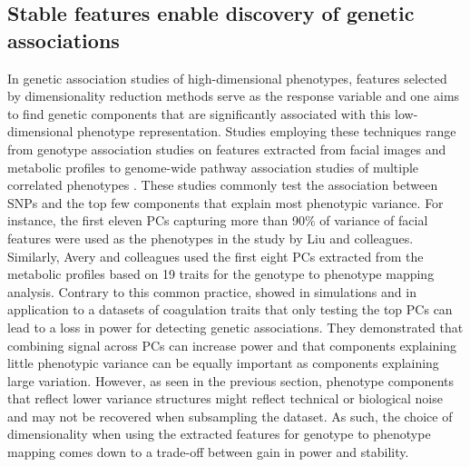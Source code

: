 \subsection{Stable features enable discovery of genetic associations}
\label{subsection:association-DimRed}
In genetic association studies of high-dimensional phenotypes, features selected by dimensionality reduction methods serve as the response variable and one aims to find genetic components that are significantly associated with this low-dimensional phenotype representation. Studies employing these techniques range from genotype association studies on features extracted from facial images \citep{Liu2012} and metabolic profiles \citep{Avery2011} to genome-wide pathway association studies of multiple correlated phenotypes \citep{Zhang2012}. These studies commonly test the association between SNPs and the top few components that explain most phenotypic variance. For instance,  the first eleven PCs capturing more than \num{90}\% of variance of facial features were used as the phenotypes in the study by Liu and colleagues. Similarly, Avery and colleagues used the first eight PCs extracted from the metabolic profiles based on \num{19} traits for the genotype to phenotype mapping analysis. Contrary to this common practice, \citet{Aschard2014} showed in simulations and in application to a datasets of coagulation traits that only testing the top PCs can lead to a loss in power for detecting genetic associations. They demonstrated that combining signal across PCs can increase power and that components explaining little phenotypic variance can be equally important as components explaining large variation. However, as seen in the previous section, phenotype components that reflect lower variance structures might reflect technical or biological noise and may not be recovered when subsampling the dataset. As such, the choice of dimensionality when using the extracted features for genotype to phenotype mapping comes down to a trade-off between gain in power and stability.


